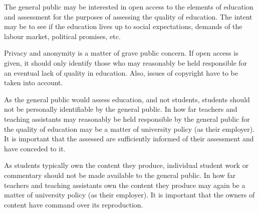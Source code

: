 The general public may be interested in open access to the elements of
education and assessment for the purposes of assessing the quality of
education. The intent may be to see if the education lives up to social
expectations, demands of the labour market, political promises, etc.

Privacy and anonymity is a matter of grave public concern. If open access is
given, it should only identify those who may reasonably be held responsible for
an eventual lack of quality in education. Also, issues of copyright have to be
taken into account.

As the general public would assess education, and not students, students should
not be personally identifiable by the general public. In how far teachers and
teaching assistants may reasonably be held responsible by the general public
for the quality of education may be a matter of university policy (as their
employer). It is important that the assessed are sufficiently informed of their
assessment and have conceded to it.

As students typically own the content they produce, individual student work or
commentary should not be made available to the general public. In how far
teachers and teaching assistants own the content they produce may again be a
matter of university policy (as their employer). It is important that the
owners of content have command over its reproduction.
